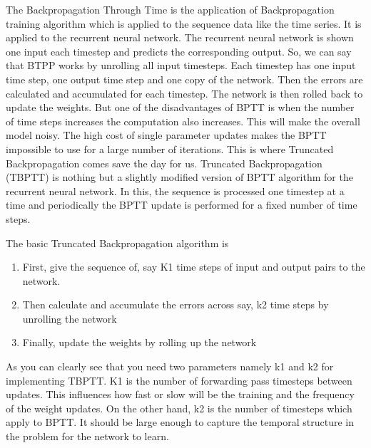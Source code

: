 The Backpropagation Through Time is the application of Backpropagation training algorithm which 
is applied to the sequence data like the time series. It is applied to the 
recurrent neural network. 
The recurrent neural network is shown one input each timestep and predicts the corresponding
output. So, we can say that BTPP works by unrolling all input timesteps.
Each timestep has one input time step, one output time step and one copy of the network.
Then the errors are calculated and accumulated for each timestep.
The network is then rolled back to update the weights.
But one of the disadvantages of BPTT is when the number of time steps increases the computation
also increases. This will make the overall model noisy. The high cost of single parameter updates
makes the BPTT impossible to use for a large number of iterations.
This is where Truncated Backpropagation comes save the day for us. 
Truncated Backpropagation (TBPTT) is nothing but a slightly modified version of BPTT algorithm 
for the recurrent neural network. In this, the sequence is processed one timestep at a time and
periodically the BPTT update is performed for a fixed number of time steps.

The basic Truncated Backpropagation algorithm is
\begin{enumerate}
    \item First, give the sequence of, say K1 time steps of input and output pairs to the network.
    \item Then calculate and accumulate the errors across say, k2 time steps 
		by unrolling the network
    \item Finally, update the weights by rolling up the network
\end{enumerate}
As you can clearly see that you need two parameters namely k1 and k2 for implementing TBPTT. 
K1 is the number of forwarding pass timesteps between updates.
This influences how fast or slow will be the training and the frequency of the weight updates. 
On the other hand, k2 is the number of timesteps which apply to BPTT. 
It should be large enough to capture the temporal structure in the problem 
for the network to learn. 

